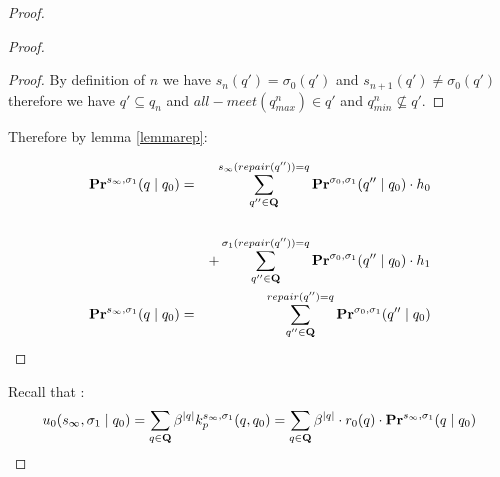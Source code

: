 \begin{proof}
\begin{proof}
\begin{proof}
			By definition of $n$ we have $s_n(q') = \sigma_0(q')$ and $s_{n+1}(q') \neq \sigma_0(q')$ therefore we have $q' \subseteq q_n$ and $all-meet(q^n_{max}) \in q'$ and $q^n_{min} \not \subseteq q'$. 
			\fi
			
			
			
		\end{proof}
		
		Therefore by lemma \ref{lemmarep}:
		
		\begin{eqnarray*}
			\mathbf{Pr}^{s_{\infty},\sigma_1}(q \mid q_0)  & =& \sum_{q''\in \mathbf{Q}}^{s_{\infty}(repair(q'')) = q} \mathbf{Pr}^{\sigma_0,\sigma_1}(q'' \mid q_0) \cdot h_0\\\\
			& & +  \sum_{q''\in \mathbf{Q}}^{\sigma_1(repair(q'')) = q} \mathbf{Pr}^{\sigma_0,\sigma_1}(q'' \mid q_0) \cdot h_1\\
			\mathbf{Pr}^{s_{\infty},\sigma_1}(q \mid q_0)  & =& \sum_{q''\in \mathbf{Q}}^{repair(q'') = q} \mathbf{Pr}^{\sigma_0,\sigma_1}(q'' \mid q_0) \\
		\end{eqnarray*}
	\end{proof}
	
	Recall that : $$u_0(s_{\infty},\sigma_1 \mid q_0) = 	\sum_{q \in \mathbf{Q}} \beta^{|q|} k^{s_{\infty},\sigma_1}_p(q,q_0) = \sum_{q \in \mathbf{Q}} \beta^{|q|} \cdot r_0(q)\cdot \mathbf{Pr}^{s_{\infty},\sigma_1}(q \mid q_0) $$
	

\end{proof}
